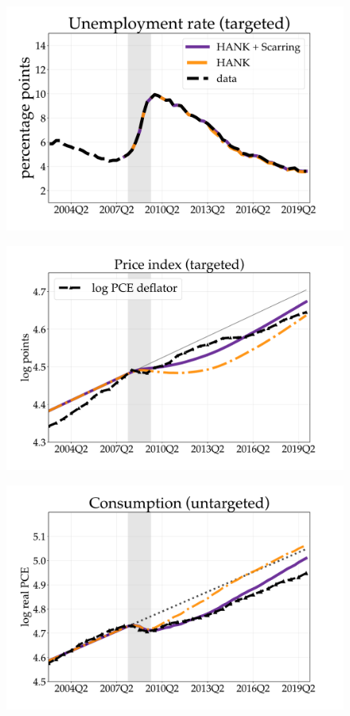 \begin{figure}[H] %
\centering
\begin{minipage}{0.51\textwidth}
\includegraphics[scale=.29]{text/chapter1/Figures/GR_sim/Cleaner/Urate_vs_data_large_new}
 \label{fig:a}
\end{minipage}\hspace*{\fill}
\begin{minipage}{0.51\textwidth}
\includegraphics[scale=.29]{text/chapter1/Figures/GR_sim/Cleaner/price_vs_data_large_new}
 \label{fig:b}
\end{minipage}
\medskip
\begin{minipage}{0.51\textwidth}
\includegraphics[scale=.29]{text/chapter1/Figures/GR_sim/Cleaner/Consumption_vs_data_large_new}

\end{minipage}
\end{figure}
